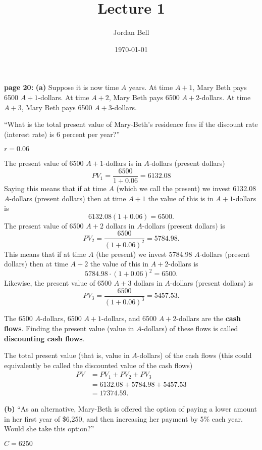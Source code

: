\documentclass{amsart}
\begin{document}
\title{Lecture 1}
\author{Jordan Bell}
\date{\today}
\maketitle

\textbf{page 20:} \textbf{(a)} Suppose it is now time $A$ years. At time $A+1$, 
Mary Beth pays 6500 $A+1$-dollars. At time $A+2$, Mary Beth pays
6500 $A+2$-dollars. At time $A+3$, Mary Beth pays 6500 $A+3$-dollars.

``What is the total present value of Mary‐Beth’s residence fees if the discount rate (interest rate) is 6 percent per year?''

$r=0.06$

The present value of 6500 $A+1$-dollars is in $A$-dollars (present dollars)
\[
PV_1 = \frac{6500}{1+0.06} = 6132.08 
\]
Saying this means that if at time $A$ (which we call the present)
we invest 6132.08 $A$-dollars (present dollars) then at time $A+1$ the value of this is
in $A+1$-dollars is
\[
6132.08(1+0.06) = 6500.
\]
The present value of 6500 $A+2$ dollars in $A$-dollars (present dollars) is
\[
PV_2 = \frac{6500}{(1+0.06)^2} = 5784.98.
\]
This means that if at time $A$ (the present) we invest 5784.98 $A$-dollars (present dollars) then at time $A+2$ the value of this in $A+2$-dollars is
\[
5784.98 \cdot (1+0.06)^2 = 6500.
\]
Likewise, the present value of 6500 $A+3$ dollars in $A$-dollars (present dollars) is
\[
PV_3 = \frac{6500}{(1+0.06)^3} = 5457.53.
\]

The 6500 $A$-dollars, 6500 $A+1$-dollars, and 6500 $A+2$-dollars are
the \textbf{cash flows}. Finding the present value (value in $A$-dollars) of these flows is called \textbf{discounting cash flows}.

The total present value (that is, value in $A$-dollars) of the cash flows (this could equivalently be called the
discounted value of the cash flows) 
\begin{align*}
PV &= PV_1+PV_2+PV_3\\
& = 6132.08 + 5784.98 + 5457.53 \\
&= 17374.59.
\end{align*}

\textbf{(b)} ``As an alternative, Mary-Beth is offered the option of paying a lower amount in her first year of \$6,250, and then increasing her payment by 5\% each year. Would she take this option?''

$C=6250$
\end{document}
